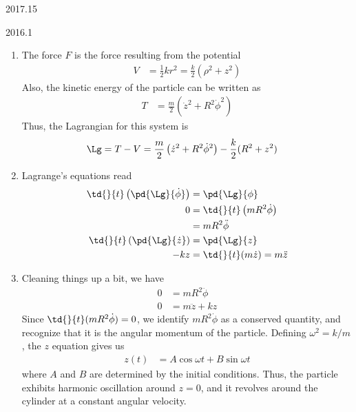\documentclass[12pt]{article}
\begin{document}
\begin{solution}{2017.15}
\end{solution}


\begin{solution}{2016.1}
\begin{enumerate}
\item
The force $F$ is the force resulting from the potential
\begin{align*}
V & = \frac{1}{2} k r^2 = \frac{k}{2} (\rho^2 + z^2)
\end{align*}
Also, the kinetic energy of the particle can be written as
\begin{align*}
T & = \frac{m}{2} \left( \dot{z}^2 + R^2 \dot{\phi}^2 \right)
\end{align*}
Thus, the Lagrangian for this system is
\begin{align*}
\Lg & = T - V 
= \frac{m}{2} \left( \dot{z}^2 + R^2 \dot{\phi}^2 \right) - \frac{k}{2} (R^2 + z^2)
\end{align*}

\item
Lagrange's equations read
\begin{align*}
\td{}{t} \left( \pd{\Lg}{\dot{\phi}} \right) & = \pd{\Lg}{\phi} \\
0 & = \td{}{t} \left( mR^2 \dot{\phi} \right) \\
& = mR^2 \ddot{\phi} \\
\td{}{t} \left( \pd{\Lg}{\dot{z}} \right) & = \pd{\Lg}{z} \\
-kz & = \td{}{t} (m \dot{z}) = m\ddot{z}
\end{align*}

\item
Cleaning things up a bit, we have
\begin{align*}
0 & = mR^2 \ddot{\phi} \\
0 & = m\ddot{z} + kz
\end{align*}
Since $\td{}{t} (mR^2 \dot{\phi}) = 0$, we identify $mR^2 \dot{\phi}$ as a conserved quantity, and recognize that it is the angular momentum of the particle.
Defining $\omega^2 = k/m$, the $z$ equation gives us
\begin{align*}
z(t) & = A \cos \omega t + B \sin \omega t
\end{align*}
where $A$ and $B$ are determined by the initial conditions.
Thus, the particle exhibits harmonic oscillation around $z = 0$, and it revolves around the cylinder at a constant angular velocity.

\end{enumerate}

\end{solution}
\end{document}
